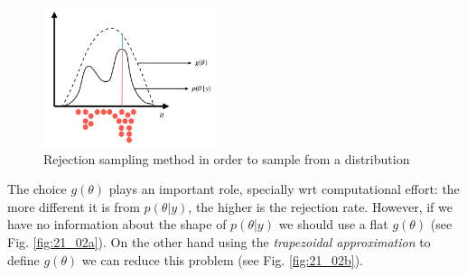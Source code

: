 \documentclass[../main/main.tex]{subfiles}
\begin{document}
\begin{figure}[h!]
\centering
\includegraphics[width=0.45\textwidth]{../lessons/image/21/image01.png}
\caption{\label{fig:21_01} Rejection sampling method in order to sample from a distribution}
\end{figure}

The choice $g(\theta)$ plays an important role, specially wrt computational effort: the more different it is from $p(\theta|y)$, the higher is the rejection rate. However, if we have no information about the shape of $p(\theta|y)$ we should use a flat $g(\theta)$ (see Fig. \ref{fig:21_02a}). On the other hand using the \textit{trapezoidal approximation} to define $g(\theta)$ we can reduce this problem (see Fig. \ref{fig:21_02b}).
\end{document}
